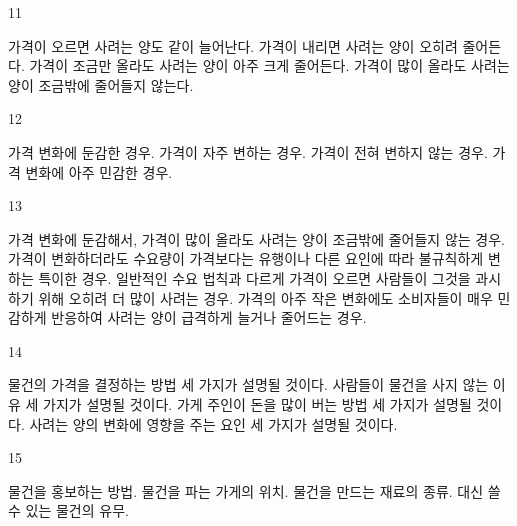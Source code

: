 \documentclass[fs9,seriesFre]{korfarm-base}
\begin{document}
\begin{kfSentenceUnit}{11}{}
\begin{kfChoices}
\kfChoice 가격이 오르면 사려는 양도 같이 늘어난다.
\kfChoice 가격이 내리면 사려는 양이 오히려 줄어든다.
\kfChoice 가격이 조금만 올라도 사려는 양이 아주 크게 줄어든다.
\kfChoice 가격이 많이 올라도 사려는 양이 조금밖에 줄어들지 않는다.
\end{kfChoices}
\end{kfSentenceUnit}

\begin{kfSentenceUnit}{12}{}
\begin{kfChoices}
\kfChoice 가격 변화에 둔감한 경우.
\kfChoice 가격이 자주 변하는 경우.
\kfChoice 가격이 전혀 변하지 않는 경우.
\kfChoice 가격 변화에 아주 민감한 경우.
\end{kfChoices}
\end{kfSentenceUnit}

\begin{kfSentenceUnit}{13}{}
\begin{kfChoices}
\kfChoice 가격 변화에 둔감해서, 가격이 많이 올라도 사려는 양이 조금밖에 줄어들지 않는 경우.
\kfChoice 가격이 변화하더라도 수요량이 가격보다는 유행이나 다른 요인에 따라 불규칙하게 변하는 특이한 경우.
\kfChoice 일반적인 수요 법칙과 다르게 가격이 오르면 사람들이 그것을 과시하기 위해 오히려 더 많이 사려는 경우.
\kfChoice 가격의 아주 작은 변화에도 소비자들이 매우 민감하게 반응하여 사려는 양이 급격하게 늘거나 줄어드는 경우.
\end{kfChoices}
\end{kfSentenceUnit}

\begin{kfSentenceUnit}{14}{}
\begin{kfChoices}
\kfChoice 물건의 가격을 결정하는 방법 세 가지가 설명될 것이다.
\kfChoice 사람들이 물건을 사지 않는 이유 세 가지가 설명될 것이다.
\kfChoice 가게 주인이 돈을 많이 버는 방법 세 가지가 설명될 것이다.
\kfChoice 사려는 양의 변화에 영향을 주는 요인 세 가지가 설명될 것이다.
\end{kfChoices}
\end{kfSentenceUnit}

\begin{kfSentenceUnit}{15}{}
\begin{kfChoices}
\kfChoice 물건을 홍보하는 방법.
\kfChoice 물건을 파는 가게의 위치.
\kfChoice 물건을 만드는 재료의 종류.
\kfChoice 대신 쓸 수 있는 물건의 유무.
\end{kfChoices}
\end{kfSentenceUnit}
\end{document}
